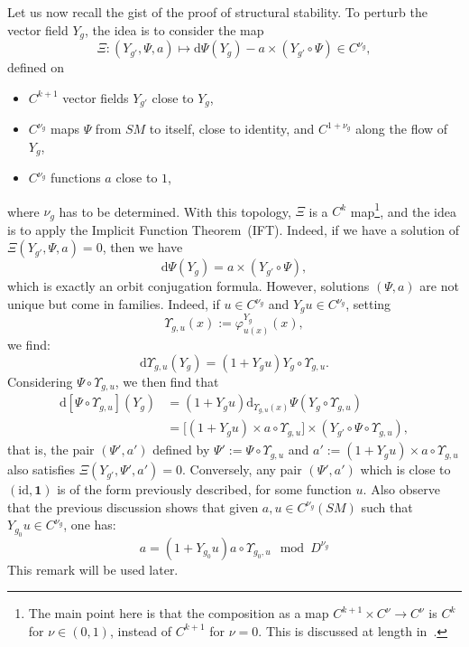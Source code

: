 \documentclass[AHL,Unicode,longabstracts,published]{cedram}
\newcommand{\bfun}{\mathbf{1}}
\newcommand{\dd}{\mathrm{d}}
\newcommand{\idl}{\mathrm{id}}
\begin{document}
Let us now recall the gist of the proof of structural stability. To perturb the vector field $Y_g$, the idea is to consider the map
\[
\Xi: \left(Y_{g'}, \Psi, a\right) \mapsto \dd \Psi(Y_g) - a \times \left(Y_{g'}\circ \Psi\right) \in C^{\nu_g},
\]
defined on
\begin{itemize}
\item $C^{k+1}$ vector fields $Y_{g'}$ close to $Y_g$,
\item $C^{\nu_g}$ maps $\Psi$ from $SM$ to itself, close to identity, and $C^{1+\nu_g}$ along the flow of $Y_g$,
\item $C^{\nu_g}$ functions $a$ close to $1$,
\end{itemize}
where $\nu_g$ has to be determined. With this topology, $\Xi$ is a $C^k$ map\footnote{The main point here is that the composition as a map $C^{k+1}\times C^\nu\to C^\nu$ is $C^k$ for $\nu\in (0,1)$, instead of $C^{k+1}$ for $\nu=0$. This is discussed at length in~\cite{DeLaLLave-Obaya-98}.}, and the idea is to apply the Implicit Function Theorem~(IFT). Indeed, if we have a solution of $\Xi(Y_{g'}, \Psi, a) = 0$, then we have
\begin{equation}\label{eq:conjugation}
\dd \Psi(Y_g) = a \times (Y_{g'} \circ \Psi),
\end{equation}
which is exactly an orbit conjugation formula. However, solutions $(\Psi,a)$ are not unique but come in families. Indeed, if $u\in C^{\nu_g}$ and $Y_g u \in C^{\nu_g}$, setting
\[
\Upsilon_{g,u}(x) := \varphi^{Y_g}_{u(x)}(x),
\]
we find:
\[
\dd \Upsilon_{g,u} (Y_g) = \left(1+ Y_g u\right) Y_g\circ \Upsilon_{g,u}.
\]
Considering $\Psi \circ \Upsilon_{g,u}$, we then find that
\begin{align*}
\dd \left[\Psi \circ \Upsilon_{g,u}\right](Y_g) & =\left(1+ Y_g u\right) \dd_{\Upsilon_{g,u}(x)} \Psi \left(Y_g \circ \Upsilon_{g,u}\right) \\
& = \Big[\left(1+ Y_g u\right) \times a \circ \Upsilon_{g,u}\Big] \times \left(Y_{g'} \circ \Psi\circ \Upsilon_{g,u}\right),
\end{align*}
that is, the pair $(\Psi',a')$ defined by $\Psi' := \Psi \circ \Upsilon_{g,u}$ and $a' := (1+ Y_g u) \times a \circ \Upsilon_{g,u}$ also satisfies $\Xi(Y_{g'},\Psi',a') = 0$. Conversely, any pair $(\Psi',a')$ which is close to $(\idl,\bfun)$ is of the form previously described, for some function $u$. Also observe that the previous discussion shows that given $a, u \in C^{\nu_g}(SM)$ such that $Y_{g_0} u\in C^{\nu_g}$, one has:
\begin{equation}\label{equation:structure}
a = \left(1+Y_{g_0}u\right) a \circ \Upsilon_{g_0,u} \mod D^{\nu_g}
\end{equation}
This remark will be used later.
\end{document}
